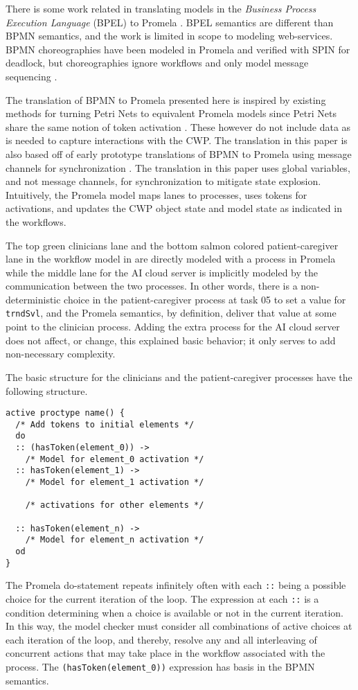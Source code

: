 There is some work related in translating models in the \emph{Business Process Execution Language} (BPEL) to Promela \cite{bpelToPromela}. BPEL semantics are different than BPMN semantics, and the work is limited in scope to modeling web-services. BPMN choreographies have been modeled in Promela and verified with SPIN for deadlock, but choreographies ignore workflows and only model message sequencing \cite{choreography}.

The translation of BPMN to Promela presented here is inspired by existing methods for turning Petri Nets to equivalent Promela models since Petri Nets share the same notion of token activation \cite{petrinetToPromela, petrinetInspiration}. These however do not include data as is needed to capture interactions with the CWP. The translation in this paper is also based off of early prototype translations of BPMN to Promela using message channels for synchronization \cite{bpmn2promela}. The translation in this paper uses global variables, and not message channels, for synchronization to mitigate state explosion.   Intuitively, the Promela model maps lanes to processes, uses tokens for activations, and updates the CWP object state and model state as indicated in the workflows.

The top green clinicians lane and the bottom salmon colored patient-caregiver lane in the workflow model in  are directly modeled with a process in Promela while the middle lane for the AI cloud server is implicitly modeled by the communication between the two processes. In other words, there is a non-deterministic choice in the patient-caregiver process at task 05 to set a value for \texttt{trndSvl}, and the Promela semantics, by definition, deliver that value at some point to the clinician process. Adding the extra process for the AI cloud server does not affect, or change, this explained basic behavior; it only serves to add non-necessary complexity.

The basic structure for the clinicians and the patient-caregiver processes have the following structure.
%
{\small
\begin{lstlisting}[style=myPromela]
active proctype name() {
  /* Add tokens to initial elements */
  do
  :: (hasToken(element_0)) ->
    /* Model for element_0 activation */
  :: hasToken(element_1) ->
    /* Model for element_1 activation */
 
    /* activations for other elements */
    
  :: hasToken(element_n) ->
    /* Model for element_n activation */
  od
}
\end{lstlisting}
}
%
\noindent The Promela do-statement repeats infinitely often with each \texttt{::} being a possible choice for the current iteration of the loop. The expression at each \texttt{::} is a condition determining when a choice is available or not in the current iteration. In this way, the model checker must consider all combinations of active choices at each iteration of the loop, and thereby, resolve any and all interleaving of concurrent actions that may take place in the workflow associated with the process. The \texttt{(hasToken(element\_0))} expression has basis in the BPMN semantics.

